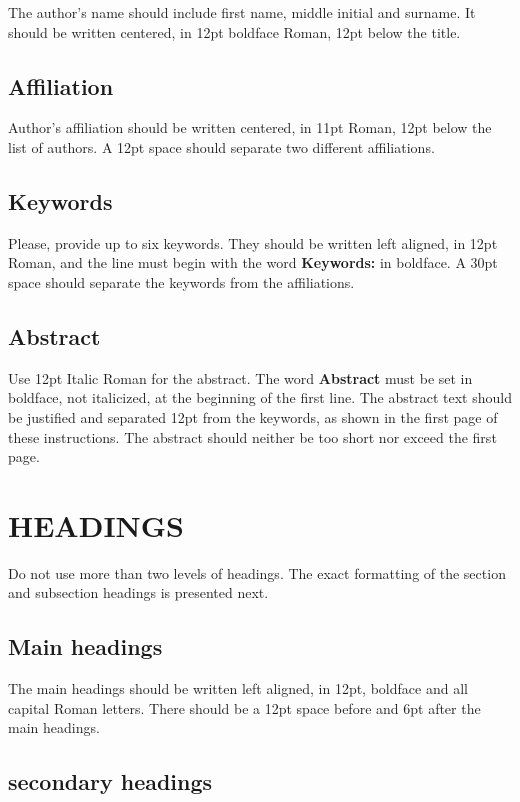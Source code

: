 \documentclass{eurodyn2026}
\begin{document}
The author's name should include first name, middle initial and surname. It
should be written centered, in 12pt boldface Roman, 12pt below the title.

\subsection{Affiliation}

Author's affiliation should be written centered, in 11pt Roman, 12pt below
the list of authors. A 12pt space should separate two different affiliations.

\subsection{Keywords}

Please, provide up to six keywords. They should be written left aligned, in 12pt Roman, and the line
must begin with the word \textbf{Keywords:} in boldface. A 30pt space should separate the keywords from the affiliations.

\subsection{Abstract}

Use 12pt Italic Roman for the abstract. The word \textbf{Abstract} must be set
in boldface, not italicized, at the beginning of the first line. The abstract
text should be justified and separated 12pt from the keywords, as shown in the
first page of these instructions. The abstract should neither be too short nor
exceed the first page.

\section{HEADINGS}

Do not use more than two levels of headings. The exact formatting of the section and subsection headings is presented next.

\subsection{Main headings}

The main headings should be written left aligned, in 12pt, boldface and all
capital Roman letters. There should be a 12pt space before and 6pt after the
main headings.

\subsection{secondary headings}
\end{document}
